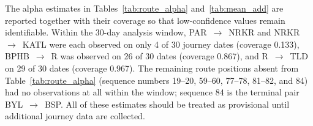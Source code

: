 \documentclass[a4paper,fleqn]{cas-dc}
\begin{document}
The alpha estimates in Tables~\ref{tab:route_alpha} and~\ref{tab:mean_add} are
reported together with their coverage so that low-confidence values remain
identifiable. Within the 30-day analysis window,
PAR~$\rightarrow$~NRKR and NRKR~$\rightarrow$~KATL were each observed on only
4 of 30 journey dates (coverage 0.133), BPHB~$\rightarrow$~R was observed on
26 of 30 dates (coverage 0.867), and R~$\rightarrow$~TLD on 29 of 30 dates
(coverage 0.967). The remaining route positions absent from
Table~\ref{tab:route_alpha} (sequence numbers 19--20, 59--60, 77--78,
81--82, and 84) had no observations at all within the window; sequence 84 is
the terminal pair BYL~$\rightarrow$~BSP. All of these estimates should be
treated as provisional until additional journey data are collected.




\clearpage
\end{document}
